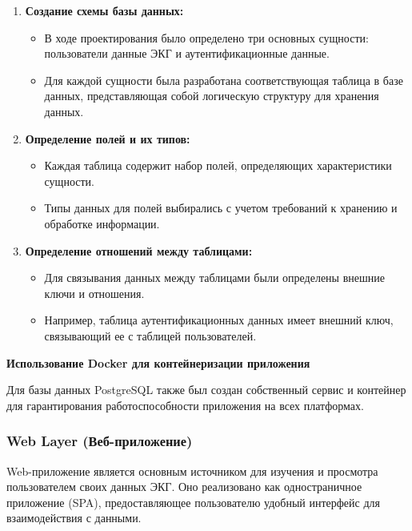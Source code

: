 \documentclass[12pt, russian]{extarticle}
\begin{document}
\begin{spacing}{1.5}
\begin{enumerate}
    \item \textbf{Создание схемы базы данных:}
        \begin{itemize}
            \item В ходе проектирования было определено три основных сущности: пользователи
                данные ЭКГ и аутентификационные данные.
            \item Для каждой сущности была разработана соответствующая таблица в базе данных,
                представляющая собой логическую структуру для хранения данных.
        \end{itemize}
    \item \textbf{Определение полей и их типов:}
        \begin{itemize}
            \item Каждая таблица содержит набор полей, определяющих характеристики сущности.
            \item Типы данных для полей выбирались с учетом требований к хранению и обработке информации.
        \end{itemize}
    \item \textbf{Определение отношений между таблицами:}
        \begin{itemize}
            \item Для связывания данных между таблицами были определены внешние ключи и отношения.
            \item Например, таблица аутентификационных данных имеет внешний ключ, связывающий ее с таблицей пользователей.
        \end{itemize}
\end{enumerate}

\par \noindent \textbf{Использование Docker для контейнеризации приложения}

Для базы данных PostgreSQL также был создан собственный сервис и контейнер для гарантирования работоспособности приложения на всех платформах.


\subsubsection{Web Layer (Веб-приложение)}

Web-приложение является основным источником для изучения и просмотра пользователем своих данных ЭКГ. Оно реализовано как одностраничное приложение (SPA), предоставляющее пользователю удобный интерфейс для взаимодействия с данными. 


\end{spacing}
\end{document}
